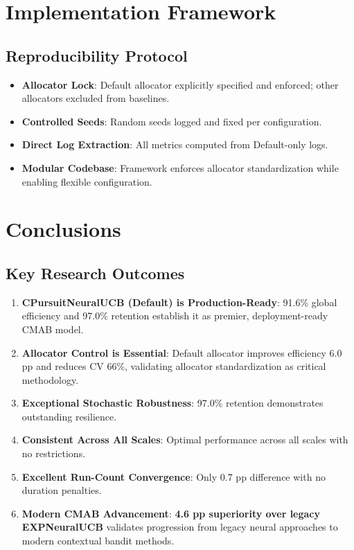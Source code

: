 \documentclass[12pt,a4paper]{article}
\newcommand{\success}[1]{\textcolor{accentgreen}{\textbf{#1}}}
\newcommand{\legacy}[1]{\textcolor{legacycolor}{\textbf{#1}}}
\begin{document}
\section{Implementation Framework}

\subsection{Reproducibility Protocol}

\begin{itemize}
    \item \textbf{Allocator Lock}: Default allocator explicitly specified and enforced; other allocators excluded from baselines.
    \item \textbf{Controlled Seeds}: Random seeds logged and fixed per configuration.
    \item \textbf{Direct Log Extraction}: All metrics computed from Default-only logs.
    \item \textbf{Modular Codebase}: Framework enforces allocator standardization while enabling flexible configuration.
\end{itemize}

\newpage
\section{Conclusions}

\subsection{Key Research Outcomes}

\begin{enumerate}
    \item \success{\textbf{CPursuitNeuralUCB (Default) is Production-Ready}}: 91.6\% global efficiency and 97.0\% retention establish it as premier, deployment-ready CMAB model.
    
    \item \success{\textbf{Allocator Control is Essential}}: Default allocator improves efficiency 6.0 pp and reduces CV 66\%, validating allocator standardization as critical methodology.
    
    \item \success{\textbf{Exceptional Stochastic Robustness}}: 97.0\% retention demonstrates outstanding resilience.
    
    \item \success{\textbf{Consistent Across All Scales}}: Optimal performance across all scales with no restrictions.
    
    \item \success{\textbf{Excellent Run-Count Convergence}}: Only 0.7 pp difference with no duration penalties.
    
    \item \legacy{\textbf{Modern CMAB Advancement}}: \success{4.6 pp superiority over legacy EXPNeuralUCB} validates progression from legacy neural approaches to modern contextual bandit methods.
\end{enumerate}
\end{document}

